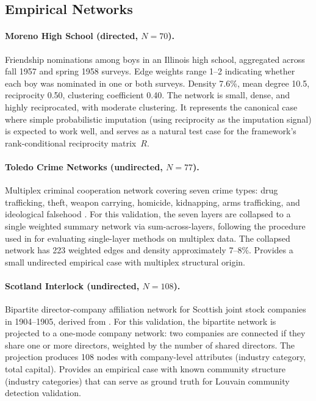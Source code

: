 \documentclass[11pt]{article}
\newcommand{\Rmat}{R}
\begin{document}
\subsection{Empirical Networks}

\paragraph{Moreno High School (directed, $N = 70$).} Friendship nominations among boys in an Illinois high school, aggregated across fall 1957 and spring 1958 surveys. Edge weights range 1--2 indicating whether each boy was nominated in one or both surveys. Density 7.6\%, mean degree 10.5, reciprocity 0.50, clustering coefficient 0.40. The network is small, dense, and highly reciprocated, with moderate clustering. It represents the canonical case where simple probabilistic imputation (using reciprocity as the imputation signal) is expected to work well, and serves as a natural test case for the framework's rank-conditional reciprocity matrix~$\Rmat$.

\paragraph{Toledo Crime Networks (undirected, $N = 77$).} Multiplex criminal cooperation network covering seven crime types: drug trafficking, theft, weapon carrying, homicide, kidnapping, arms trafficking, and ideological falsehood \citep{Toledo2023}. For this validation, the seven layers are collapsed to a single weighted summary network via sum-across-layers, following the procedure used in \citet{Bellutta2026} for evaluating single-layer methods on multiplex data. The collapsed network has 223 weighted edges and density approximately 7--8\%. Provides a small undirected empirical case with multiplex structural origin.

\paragraph{Scotland Interlock (undirected, $N = 108$).} Bipartite director-company affiliation network for Scottish joint stock companies in 1904--1905, derived from \citet{ScottHughes1980}. For this validation, the bipartite network is projected to a one-mode company network: two companies are connected if they share one or more directors, weighted by the number of shared directors. The projection produces 108 nodes with company-level attributes (industry category, total capital). Provides an empirical case with known community structure (industry categories) that can serve as ground truth for Louvain community detection validation.
\end{document}
